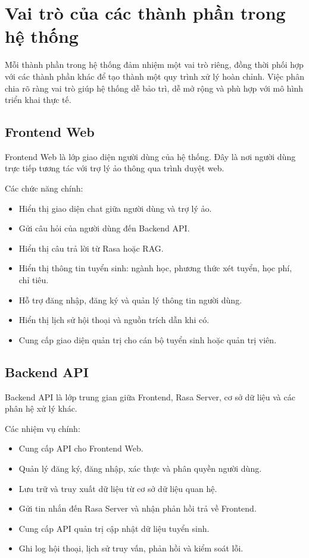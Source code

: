 ﻿\section{Vai trò của các thành phần trong hệ thống}

Mỗi thành phần trong hệ thống đảm nhiệm một vai trò riêng, đồng thời phối hợp với các thành phần khác để tạo thành một quy trình xử lý hoàn chỉnh. Việc phân chia rõ ràng vai trò giúp hệ thống dễ bảo trì, dễ mở rộng và phù hợp với mô hình triển khai thực tế.

\subsection{Frontend Web}

Frontend Web là lớp giao diện người dùng của hệ thống. Đây là nơi người dùng trực tiếp tương tác với trợ lý ảo thông qua trình duyệt web.

Các chức năng chính:
\begin{itemize}
    \item Hiển thị giao diện chat giữa người dùng và trợ lý ảo.
    \item Gửi câu hỏi của người dùng đến Backend API.
    \item Hiển thị câu trả lời từ Rasa hoặc RAG.
    \item Hiển thị thông tin tuyển sinh: ngành học, phương thức xét tuyển, học phí, chỉ tiêu.
    \item Hỗ trợ đăng nhập, đăng ký và quản lý thông tin người dùng.
    \item Hiển thị lịch sử hội thoại và nguồn trích dẫn khi có.
    \item Cung cấp giao diện quản trị cho cán bộ tuyển sinh hoặc quản trị viên.
\end{itemize}

\subsection{Backend API}

Backend API là lớp trung gian giữa Frontend, Rasa Server, cơ sở dữ liệu và các phân hệ xử lý khác.

Các nhiệm vụ chính:
\begin{itemize}
    \item Cung cấp API cho Frontend Web.
    \item Quản lý đăng ký, đăng nhập, xác thực và phân quyền người dùng.
    \item Lưu trữ và truy xuất dữ liệu từ cơ sở dữ liệu quan hệ.
    \item Gửi tin nhắn đến Rasa Server và nhận phản hồi trả về Frontend.
    \item Cung cấp API quản trị cập nhật dữ liệu tuyển sinh.
    \item Ghi log hội thoại, lịch sử truy vấn, phản hồi và kiểm soát lỗi.
\end{itemize}

